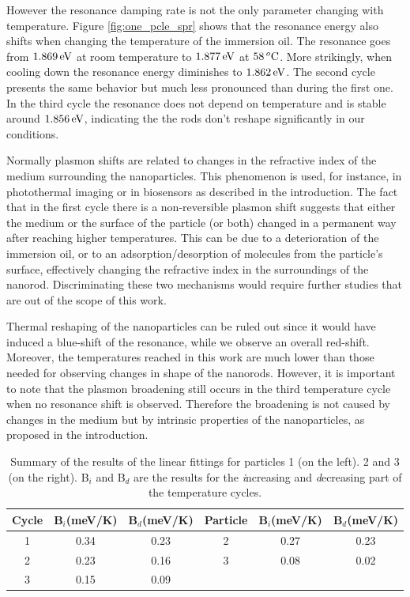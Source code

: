 However the resonance damping rate is not the only parameter changing with
temperature. Figure \ref{fig:one_pcle_spr} shows that the resonance energy also
shifts when changing the temperature of the immersion oil. The resonance goes
from $1.869\,\textrm{eV}$ at room temperature to $1.877\,\textrm{eV}$ at $58\,^o\textrm{C}$. More
strikingly, when cooling down the resonance energy diminishes to $1.862\,\textrm{eV}$. The
second cycle presents the same behavior but much less pronounced than during
the first one. In the third cycle the resonance does not depend on temperature
and is stable around $1.856\,\textrm{eV}$, indicating the the rods don't reshape
significantly in our conditions.

Normally plasmon shifts are related to changes in the refractive index of the
medium surrounding the nanoparticles. This phenomenon is used, for instance, in
photothermal imaging\cite{Berciaud2006,Gaiduk2010b} or in
biosensors\cite{Zijlstra2012} as described in the introduction. The fact that in
the first cycle there is a non-reversible plasmon shift suggests that either the
medium or the surface of the particle (or both) changed in a permanent way after
reaching higher temperatures. This can be due to a deterioration of the
immersion oil, or to an adsorption/desorption of molecules from the particle's
surface, effectively changing the refractive index in the surroundings of the
nanorod. Discriminating these two mechanisms would require further studies that
are out of the scope of this work. 

Thermal reshaping of the nanoparticles can be ruled out since it would have
induced a blue-shift of the resonance\cite{Liu2009,Horiguchi2008}, while we
observe an overall red-shift. Moreover, the temperatures reached in this work
are much lower than those needed for observing changes in shape of the nanorods.
However, it is important to note that the plasmon broadening still occurs in the
third temperature cycle when no resonance shift is observed. Therefore the
broadening is not caused by changes in the medium but by intrinsic properties of
the nanoparticles, as proposed in the introduction.

\begin{table}
\begin{tabular}{ c | c c || c | c | c}
  Cycle & B$_i$(meV/K) & B$_d$(meV/K) & Particle & B$_i$(meV/K) & B$_d$(meV/K)\\
  \hline
  1 & 0.34 & 0.23 & 2 & 0.27 & 0.23\\
  2 & 0.23 & 0.16 & 3 & 0.08 & 0.02\\
  3 & 0.15 & 0.09 & & \\

\end{tabular}
  \caption{Summary of the results of the linear fittings for particles 1 (on
  the left). 2 and 3 (on the right). B$_i$ and B$_d$ are the results for the
  \textit{i}ncreasing and \textit{d}ecreasing part of the temperature
  cycles.}\label{table-results}
\end{table}

